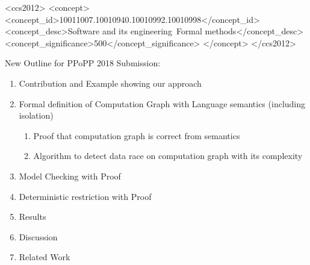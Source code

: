 \documentclass[sigplan,10pt,review,anonymous,table]{acmart}\settopmatter{printfolios=true,printccs=false,printacmref=false}
\begin{document}
%
%
\begin{CCSXML}
<ccs2012>
<concept>
<concept_id>10011007.10010940.10010992.10010998</concept_id>
<concept_desc>Software and its engineering~Formal methods</concept_desc>
<concept_significance>500</concept_significance>
</concept>
</ccs2012>
\end{CCSXML}




\maketitle


New Outline for PPoPP 2018 Submission:
\begin{enumerate}
\item Contribution and Example showing our approach
\item Formal definition of Computation Graph with Language semantics (including isolation)
  \begin{enumerate}
  \item Proof that computation graph is correct from semantics
  \item Algorithm to detect data race on computation graph with its complexity
  \end{enumerate}
\item Model Checking with Proof
\item Deterministic restriction with Proof
\item Results
\item Discussion
\item Related Work
\end{enumerate}
\end{document}
